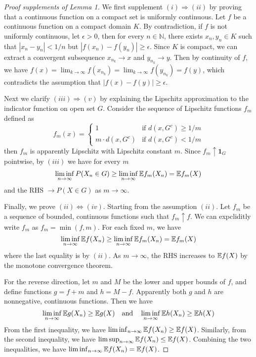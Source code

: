 \documentclass{article}
\begin{document}
\begin{proof}[Proof supplements of Lemma 1]
    We first supplement $(i) \Rightarrow (ii)$ by proving that a continuous function on a compact set is uniformly continuous. Let $f$ be a continuous function on a compact domain $K$. By contradiction, if $f$ is not uniformly continuous, let $\epsilon > 0$, then for every $n \in \mathbb{N}$, there exists $x_n, y_n \in K$ such that $|x_n - y_n| < 1/n$ but $|f(x_n) - f(y_n)| \geq \epsilon$. Since $K$ is compact, we can extract a convergent subsequence $x_{n_k} \to x$ and $y_{n_k} \to y$. Then by continuity of $f$, we have $f(x) = \lim_{k \to \infty} f(x_{n_k}) = \lim_{k \to \infty} f(y_{n_k}) = f(y)$, which contradicts the assumption that $|f(x) - f(y)| \geq \epsilon$.

    Next we clarify $(iii) \Rightarrow (v)$ by explaining the Lipschitz approximation to the indicator function on open set $G$. Consider the sequence of Lipschitz functions $f_m$ defined as
    \begin{equation}
        f_m(x) = \begin{cases}
            1                 & \text{if } d(x, G^c) \geq 1/m \\
            m \cdot d(x, G^c) & \text{if } d(x, G^c) < 1/m
        \end{cases}
    \end{equation}
    then $f_m$ is apparently Lipschitz with Lipschitz constant $m$. Since $f_m \uparrow \mathbf{1}_G$ pointwise, by $(iii)$ we have for every $m$
    \begin{equation}
        \liminf_{n\to\infty} P(X_n \in G) \geq \liminf _{n\to\infty}\mathbb{E} f_m(X_n) = \mathbb{E} f_m(X)
    \end{equation}
    and the RHS $\to P(X \in G)$ as $m \to \infty$.

    Finally, we prove $(ii) \Leftrightarrow (iv)$. Starting from the assumption $(ii)$. Let $f_m$ be a sequence of bounded, continuous functions such that $f_m \uparrow f$. We can expcliditly write $f_m$ as $f_m = \min(f, m)$. For each fixed $m$, we have
    \begin{equation}
        \liminf_{n\to\infty} \mathbb{E} f(X_n) \geq \liminf_{n\to\infty} \mathbb{E} f_m(X_n) = \mathbb{E} f_m(X)
    \end{equation}
    where the last equality is by $(ii)$. As $m \to \infty$, the RHS increases to $\mathbb{E} f(X)$ by the monotone convergence theorem.

    For the reverse direction, let $m$ and $M$ be the lower and upper bounds of $f$, and define functions $g = f + m$ and $h = M - f$. Apparently both $g$ and $h$ are nonnegative, continuous functions. Then we have
    \begin{equation}
        \liminf_{n\to\infty} \mathbb{E} g(X_n) \geq \mathbb{E} g(X) \quad \text{and} \quad \liminf_{n\to\infty} \mathbb{E} h(X_n) \geq \mathbb{E} h(X)
    \end{equation}
    From the first inequality, we have $\liminf_{n\to\infty} \mathbb{E} f(X_n) \geq \mathbb{E} f(X)$. Similarly, from the second inequality, we have $\limsup_{n\to\infty} \mathbb{E} f(X_n) \leq \mathbb{E} f(X)$. Combining the two inequalities, we have $\liminf_{n\to\infty} \mathbb{E} f(X_n) = \mathbb{E} f(X)$.
\end{proof}
\end{document}
